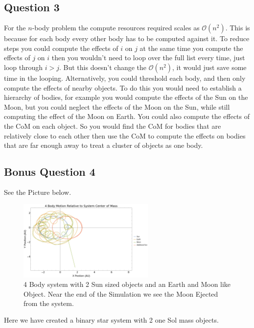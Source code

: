 \documentclass{article}
\begin{document}
\subsection{Question 3}
For the $n$-body problem the compute resources required scales as $\mathcal{O}(n^2)$. This is because for each body every other body has to be computed against it. To reduce steps you could compute the effects of $i$ on $j$ at the same time you compute the effects of $j$ on $i$ then you wouldn't need to loop over the full list every time, just loop through  $i>j$. But this doesn't change the  $\mathcal{O}(n^2)$, it would just save some time in the looping. Alternatively, you could threshold each body, and then only compute the effects of nearby objects. To do this you would need to establish a hierarchy of bodies, for example you would compute the effects of the Sun on the Moon, but you could neglect the effects of the Moon on the Sun, while still computing the effect of the Moon on Earth. You could also compute the effects of the CoM on each object. So you would find the CoM for bodies that are relatively close to each other then use the CoM to compute the effects on bodies that are far enough away to treat a cluster of objects as one body.

\subsection{Bonus Question 4}

See the Picture below.

\begin{figure}[!htb]
	\begin{center}
		\includegraphics[width=0.6\textwidth]{images/p4-1a.pdf}
	\end{center}
	\caption{4 Body system with 2 Sun sized objects and an Earth and Moon like Object. Near the end of the Simulation we see the Moon Ejected from the system.}
\label{fig:qual}
\end{figure}
\FloatBarrier

Here we have created a binary star system with 2 one Sol mass objects. 
\end{document}

